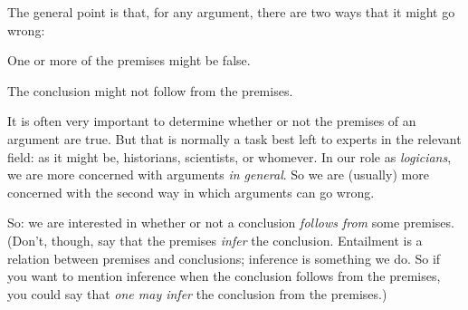 %
The general point is that, for any argument, there are two ways that it might go wrong:
	\begin{ebullet}
		\item One or more of the premises might be false. 
		\item The conclusion might not follow from the premises.
	\end{ebullet}
It is often very important to determine whether or not the premises of an argument are true. But that is normally a task best left to experts in the relevant field: as it might be, historians, scientists, or whomever. In our role as \emph{logicians}, we are more concerned with arguments \emph{in general}. So we are (usually) more concerned with the second way in which arguments can go wrong.

So: we are interested in whether or not a conclusion \emph{follows from} some premises. (Don't, though, say that the premises \emph{infer} the conclusion. Entailment is a relation between premises and conclusions; inference is something we do. So if you want to mention inference when the conclusion follows from the premises, you could say that \emph{one may infer} the conclusion from the premises.)



